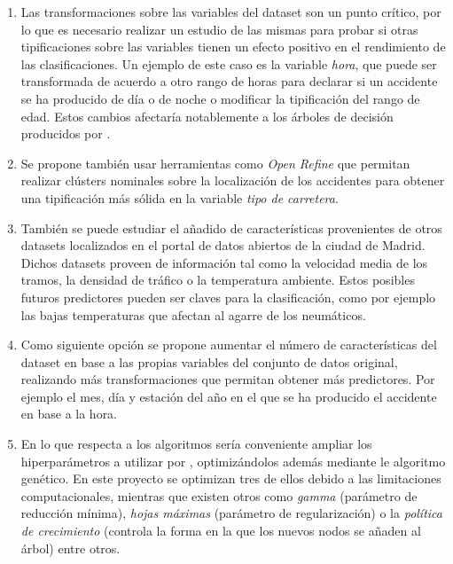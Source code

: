 	\begin{enumerate}


		\item Las transformaciones sobre las variables del dataset son un punto crítico, por lo que es necesario realizar un estudio de las mismas para probar si otras tipificaciones sobre las variables tienen un efecto positivo en el rendimiento de las clasificaciones. Un ejemplo de este caso es la variable \textit{hora}, que puede ser transformada de acuerdo a otro rango de horas para declarar si un accidente se ha producido de día o de noche o modificar la tipificación del rango de edad. Estos cambios afectaría notablemente a los árboles de decisión producidos por .

		\item Se propone también usar herramientas como \textit{Open Refine} \cite{OpenRefine} que permitan realizar clústers nominales sobre la localización de los accidentes para obtener una tipificación más sólida en la variable \textit{tipo de carretera}.

		\item También se puede estudiar el añadido de características provenientes de otros datasets localizados en el portal de datos abiertos de la ciudad de Madrid. Dichos datasets proveen de información tal como la velocidad media de los tramos, la densidad de tráfico o la temperatura ambiente. Estos posibles futuros predictores pueden ser claves para la clasificación, como por ejemplo las bajas temperaturas que afectan al agarre de los neumáticos.

		\item Como siguiente opción se propone aumentar el número de características del dataset en base a las propias variables del conjunto de datos original, realizando más transformaciones que permitan obtener más predictores. Por ejemplo el mes, día y estación del año en el que se ha producido el accidente en base a la hora.

		\item En lo que respecta a los algoritmos sería conveniente ampliar los hiperparámetros a utilizar por , optimizándolos además mediante le algoritmo genético. En este proyecto se optimizan tres de ellos debido a las limitaciones computacionales, mientras que existen otros como \textit{gamma} (parámetro de reducción mínima), \textit{hojas máximas} (parámetro de regularización) o la \textit{política de crecimiento} (controla la forma en la que los nuevos nodos se añaden al árbol) entre otros.


\end{enumerate}
